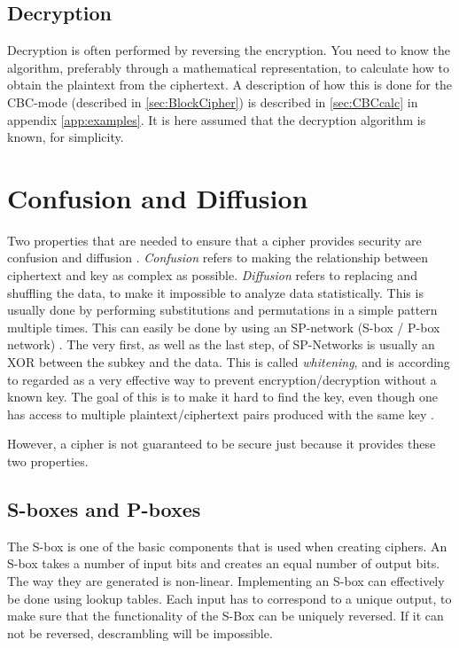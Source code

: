 \subsection{Decryption}
Decryption is often performed by reversing the encryption. You need to 
know the algorithm, preferably through a mathematical representation, 
to calculate how to obtain the plaintext from the ciphertext. A 
description of how this is done for the CBC-mode (described in 
\ref{sec:BlockCipher}) is described in \ref{sec:CBCcalc} in appendix 
\ref{app:examples}. It is here assumed that the decryption algorithm 
is known, for simplicity. 
\section{Confusion and Diffusion}\label{ch:ConfDiff}
Two properties that are needed to ensure that a cipher provides 
security are confusion and diffusion \citep{Shannon:1949}. 
\emph{Confusion} refers to making the relationship between ciphertext 
and key as complex as possible. \emph{Diffusion} refers to replacing 
and shuffling the data, to make it impossible to analyze data 
statistically. This is usually done by performing substitutions and 
permutations in a simple pattern multiple times. This can easily be 
done by using an SP-network (S-box / P-box network) 
\citep[pp. 74--79]{Stinson:2006}. The very first, as well as the last 
step, of SP-Networks is usually an XOR between the subkey and the data. 
This is called \emph{whitening}, and is according to 
\citet[p. 75]{Stinson:2006} regarded as a very effective way to prevent 
encryption/decryption without a known key. The goal of this is to make 
it hard to find the key, even though one has access to multiple 
plaintext/ciphertext pairs produced with the same key 
\citep{Shannon:1949}.

However, a cipher is not guaranteed to be secure just because it 
provides these two properties.

\subsection{S-boxes and P-boxes}
The S-box is one of the basic components that is used when creating 
ciphers. An S-box takes a number of input bits and creates an equal 
number of output bits. The way they are generated is non-linear. 
Implementing an S-box can effectively be done using lookup tables. 
Each input has to correspond to a unique output, to make sure that the 
functionality of the S-Box can be uniquely reversed. If it can not be 
reversed, descrambling will be impossible. 
\citep[pp. 74--75]{Stinson:2006}

